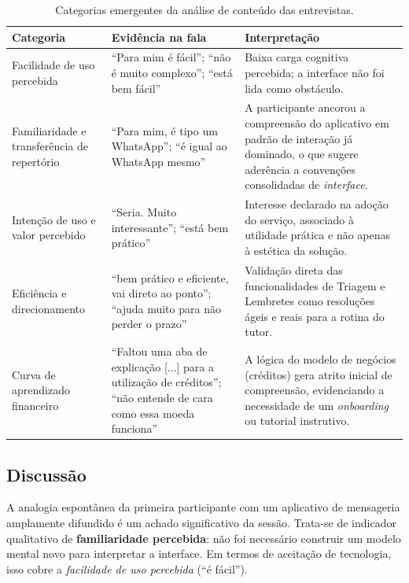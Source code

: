 \documentclass[12pt,a4paper]{article}
\begin{document}
\begin{table}[h!]
\centering
\small
\begin{tabular}{@{}>{\raggedright\arraybackslash}p{3.6cm}>{\raggedright\arraybackslash}p{5.4cm}>{\raggedright\arraybackslash}p{4.4cm}@{}}
\toprule
\textbf{Categoria} & \textbf{Evidência na fala} & \textbf{Interpretação} \\
\midrule
Facilidade de uso percebida &
\enquote{Para mim é fácil}; \enquote{não é muito complexo}; \enquote{está bem fácil} &
Baixa carga cognitiva percebida; a interface não foi lida como obstáculo. \\
\addlinespace
Familiaridade e transferência de repertório &
\enquote{Para mim, é tipo um WhatsApp}; \enquote{é igual ao WhatsApp mesmo} &
A participante ancorou a compreensão do aplicativo em padrão de interação já dominado, o que
sugere aderência a convenções consolidadas de \textit{interface}. \\
\addlinespace
Intenção de uso e valor percebido &
\enquote{Seria. Muito interessante}; \enquote{está bem prático} &
Interesse declarado na adoção do serviço, associado à utilidade prática e não apenas à
estética da solução. \\
\addlinespace
Eficiência e direcionamento &
\enquote{bem prático e eficiente, vai direto ao ponto}; \enquote{ajuda muito para não perder o prazo} &
Validação direta das funcionalidades de Triagem e Lembretes como resoluções ágeis e reais para a rotina do tutor. \\
\addlinespace
Curva de aprendizado financeiro &
\enquote{Faltou uma aba de explicação [...] para a utilização de créditos}; \enquote{não entende de cara como essa moeda funciona} &
A lógica do modelo de negócios (créditos) gera atrito inicial de compreensão, evidenciando a necessidade de um \textit{onboarding} ou tutorial instrutivo. \\
\bottomrule
\end{tabular}
\caption{Categorias emergentes da análise de conteúdo das entrevistas.}
\label{tab:categorias}
\end{table}
\subsection{Discussão}

A analogia espontânea da primeira participante com um aplicativo de mensageria amplamente difundido é um achado significativo da sessão. Trata-se de indicador qualitativo de \textbf{familiaridade percebida}: não foi necessário construir um modelo mental novo para interpretar a interface. Em termos de aceitação de tecnologia, isso cobre a \textit{facilidade de uso percebida} (\enquote{é fácil}).
\end{document}
